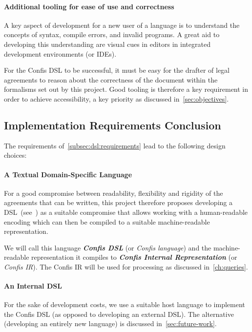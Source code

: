 \paragraph{Additional tooling for ease of use and correctness}

A key aspect of development for a new user of a language is to understand the concepts of syntax, compile errors, and invalid programs.
A great aid to developing this understanding are visual cues in editors in integrated development environments (or IDEs).

For the Confis DSL to be successful, it must be easy for the drafter of legal agreements to reason about the correctness of the document within the formalisms set out by this project.
Good tooling is therefore a key requirement in order to achieve accessibility, a key priority as discussed in~\autoref{sec:objectives}.

\subsection{Implementation Requirements Conclusion}\label{subsec:dsl-design-conclusion}

The requirements of~\autoref{subsec:dsl:requirements} lead to the following design choices:

\paragraph{A Textual Domain-Specific Language} For a good compromise between readability, flexibility and rigidity of the agreements that can be written, this project therefore proposes developing a DSL~(see~) as a suitable compromise that allows working with a human-readable encoding which can then be compiled to a suitable machine-readable representation.

We will call this language \textbf{\emph{Confis DSL}} (or \emph{Confis language}) and the machine-readable representation it compiles to \textbf{\emph{Confis Internal Representation}} (or \emph{Confis IR}).
The Confis IR will be used for processing as discussed in~\autoref{ch:queries}.

\paragraph{An Internal DSL}
For the sake of development costs, we use a suitable host language to implement the Confis DSL (as opposed to developing an external DSL).
The alternative (developing an entirely new language) is discussed in~\autoref{sec:future-work}.

